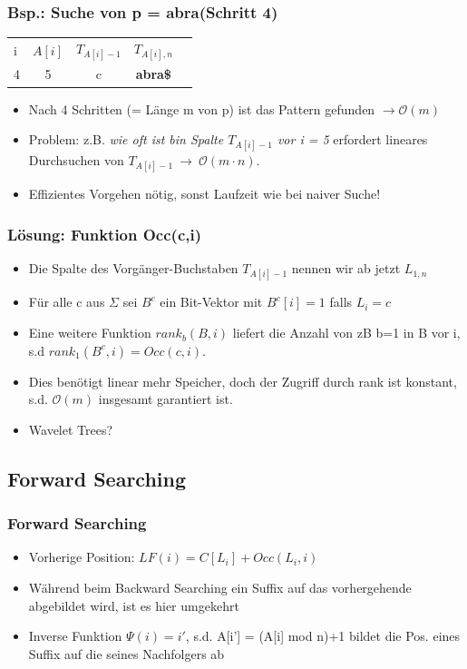 \documentclass{beamer}
\begin{document}
\begin{frame}
\frametitle{Bsp.: Suche von p = \glqq abra\grqq  (Schritt 4)}
\begin{tabular}{l c cc r}
i & $A[i]$ & $T_{A[i]-1}$ & $T_{A[i],n}$\\
4 & 5 & c & \color{red}\textbf{abra\$} \\
\end{tabular}
\begin{itemize}
\item Nach 4 Schritten (= Länge m von p) ist das Pattern gefunden $\rightarrow \mathcal{O}(m)$
\item Problem: z.B. \textit{wie oft ist \glqq b\grqq  in Spalte $T_{A[i]-1}$ vor i = 5} erfordert lineares Durchsuchen von $T_{A[i]-1}\ \rightarrow\ \mathcal{O}(m\cdot n)$.
\item Effizientes Vorgehen nötig, sonst Laufzeit wie bei naiver Suche!
\end{itemize}
\end{frame}
\begin{frame}
\frametitle{Lösung: Funktion Occ(c,i)}
\begin{itemize}
\item Die Spalte des Vorgänger-Buchstaben $T_{A[i]-1}$ nennen wir ab jetzt $L_{1,n}$
\item Für alle c aus $\Sigma$ sei $B^{c}$ ein Bit-Vektor mit $B^{c}[i] = 1$ falls $L_{i} = c$
\item Eine weitere Funktion $rank_{b}(B,i)$ liefert die Anzahl von zB b=1 in B vor i, s.d $rank_{1}(B^{c},i) = Occ(c,i)$.
\item Dies benötigt linear mehr Speicher, doch der Zugriff durch rank ist konstant, s.d. $\mathcal{O}(m)$ insgesamt garantiert ist.
\item Wavelet Trees?
\end{itemize}
\end{frame}
\begin{frame}
\subsection{Forward Searching}
\frametitle{Forward Searching}
\begin{itemize}
\item Vorherige Position: $LF(i) = C[L_i] + Occ(L_i,i)$
\item Während beim Backward Searching ein Suffix auf das vorhergehende abgebildet wird, ist es hier umgekehrt
\item Inverse Funktion $\Psi(i) = i'$, s.d. A[i'] = (A[i] mod n)+1 bildet die Pos. eines Suffix auf die seines Nachfolgers ab
\end{itemize}
\end{frame}
\end{document}
